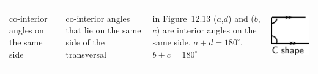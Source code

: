\begin{center}
\begin{xtabular*}{\mytablewidth}[t]{|p{3cm}|p{3cm}|p{3cm}|p{20\mystarwidth}|}
    
        co-interior angles on the same side &
    
    
        co-interior angles that lie on the same side of the transversal &
    
    
        in Figure~12.13 (\begin{math}a\end{math},\begin{math}d\end{math}) and (\begin{math}b\end{math},\begin{math}c\end{math}) are interior angles on the same side. \begin{math}a+d={180}^{\circ }\end{math}, \begin{math}b+c={180}^{\circ }\end{math} &
    
    
        
                  
    \setcounter{subfigure}{0}

\label{m39370*id316923}
    \begin{center}
    \label{m39370*id316923!!!underscore!!!media}\label{m39370*id316923!!!underscore!!!printimage}\includegraphics[width=.2\columnwidth]{col11306.imgs/m39370_MG10C13_013.png} %
        
      \vspace{2pt}
    \vspace{.1in}
    

\end{center}
\end{xtabular*}
\end{center}
